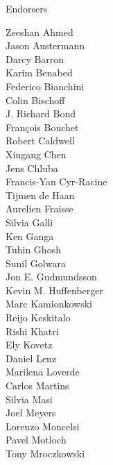 \documentclass[PICOReport.tex]{subfiles}
\begin{document}
\Large { \centerline {Endorsers}}

\footnotesize {

\begin{multicols}{4}

Zeeshan Ahmed                   \\
Jason Austermann                \\
Darcy Barron                    \\
Karim Benabed                   \\
Federico Bianchini              \\
Colin Bischoff                  \\
J. Richard Bond                 \\
Fran\c{c}ois Bouchet            \\
Robert Caldwell                 \\
Xingang Chen                    \\
Jens Chluba                     \\
Francis-Yan Cyr-Racine          \\
Tijmen de Haan                  \\
Aurelien Fraisse                \\
Silvia Galli                    \\
Ken Ganga                       \\
Tuhin Ghosh                     \\
Sunil Golwara                   \\
Jon E. Gudmundsson              \\
Kevin M. Huffenberger           \\
Marc Kamionkowski               \\
Reijo Keskitalo                 \\
Rishi Khatri                    \\
Ely Kovetz                      \\
Daniel Lenz                     \\
Marilena Loverde                \\
Carlos Martins                  \\
Silvia Masi                     \\
Joel Meyers                     \\
Lorenzo Moncelsi                \\
Pavel Motloch                   \\
Tony Mroczkowski                \\

\end{multicols}}
\end{document}
